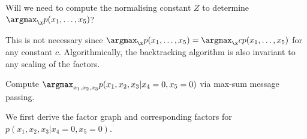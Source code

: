   \begin{exenumerate}
  \item Will we need to compute the normalising constant $Z$ to determine $\argmax_{\x} p(x_1, \ldots, x_5)$?

    \begin{solution}
      This is not necessary since $\argmax_{\x} p(x_1, \ldots, x_5) =
      \argmax_{\x} c p(x_1, \ldots, x_5)$ for any constant
      $c$. Algorithmically, the backtracking algorithm is also
      invariant to any scaling of the factors.
    \end{solution}
  \item Compute $\argmax_{x_1, x_2, x_3} p(x_1, x_2, x_3 | x_4=0, x_5=0)$ via max-sum message passing.
    \begin{solution}
      We first derive the factor graph and corresponding factors for
      $p(x_1, x_2, x_3 | x_4=0, x_5=0)$.


\end{solution}
\end{exenumerate}
